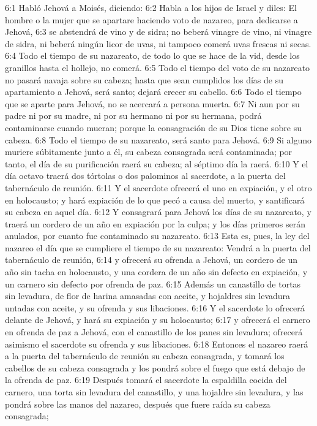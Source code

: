 6:1 Habló Jehová a Moisés, diciendo:  
6:2 Habla a los hijos de Israel y diles: El hombre o la mujer que se apartare haciendo voto de nazareo, para dedicarse a Jehová,  
6:3 se abstendrá de vino y de sidra; no beberá vinagre de vino, ni vinagre de sidra, ni beberá ningún licor de uvas, ni tampoco comerá uvas frescas ni secas.  
6:4 Todo el tiempo de su nazareato, de todo lo que se hace de la vid, desde los granillos hasta el hollejo, no comerá.  
6:5 Todo el tiempo del voto de su nazareato no pasará navaja sobre su cabeza; hasta que sean cumplidos los días de su apartamiento a Jehová, será santo; dejará crecer su cabello.  
6:6 Todo el tiempo que se aparte para Jehová, no se acercará a persona muerta.  
6:7 Ni aun por su padre ni por su madre, ni por su hermano ni por su hermana, podrá contaminarse cuando mueran; porque la consagración de su Dios tiene sobre su cabeza.  
6:8 Todo el tiempo de su nazareato, será santo para Jehová.  
6:9 Si alguno muriere súbitamente junto a él, su cabeza consagrada será contaminada; por tanto, el día de su purificación raerá su cabeza; al séptimo día la raerá.  
6:10 Y el día octavo traerá dos tórtolas o dos palominos al sacerdote, a la puerta del tabernáculo de reunión.  
6:11 Y el sacerdote ofrecerá el uno en expiación, y el otro en holocausto; y hará expiación de lo que pecó a causa del muerto, y santificará su cabeza en aquel día.  
6:12 Y consagrará para Jehová los días de su nazareato, y traerá un cordero de un año en expiación por la culpa; y los días primeros serán anulados, por cuanto fue contaminado su nazareato.  
6:13 Esta es, pues, la ley del nazareo el día que se cumpliere el tiempo de su nazareato: Vendrá a la puerta del tabernáculo de reunión,  
6:14 y ofrecerá su ofrenda a Jehová, un cordero de un año sin tacha en holocausto, y una cordera de un año sin defecto en expiación, y un carnero sin defecto por ofrenda de paz.  
6:15 Además un canastillo de tortas sin levadura, de flor de harina amasadas con aceite, y hojaldres sin levadura untadas con aceite, y su ofrenda y sus libaciones.  
6:16 Y el sacerdote lo ofrecerá delante de Jehová, y hará su expiación y su holocausto;  
6:17 y ofrecerá el carnero en ofrenda de paz a Jehová, con el canastillo de los panes sin levadura; ofrecerá asimismo el sacerdote su ofrenda y sus libaciones.  
6:18 Entonces el nazareo raerá a la puerta del tabernáculo de reunión su cabeza consagrada, y tomará los cabellos de su cabeza consagrada y los pondrá sobre el fuego que está debajo de la ofrenda de paz.  
6:19 Después tomará el sacerdote la espaldilla cocida del carnero, una torta sin levadura del canastillo, y una hojaldre sin levadura, y las pondrá sobre las manos del nazareo, después que fuere raída su cabeza consagrada;  
